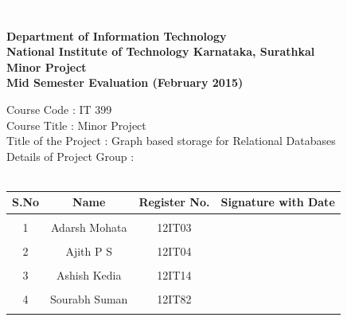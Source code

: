 \documentclass[12pt, oneside]{book}
\begin{document}
 \pagebreak \textcolor{white}{text}
\thispagestyle{empty}
\pagebreak
\begin{center}
\Large
\textbf{Department of Information Technology} \\
\normalsize
\textbf{National Institute of Technology Karnataka, Surathkal} \\
\vspace{1cm} \Large
\textbf{Minor Project} \\ \vspace{0.5cm}
\textbf{Mid Semester Evaluation (February 2015)}
\vspace{1cm}
\end{center}
Course Code : IT 399 \\
Course Title : Minor Project \\
Title of the Project : Graph based storage for Relational Databases \\
Details of Project Group : \\
\vspace{5mm}
\\
\begin{table}[h!]
  \begin{center}
   \begin{tabular}{ p{} | p{} | p{} | p{} }
      \hline
      \multicolumn{1}{|c|}{\textbf{S.No}} & \multicolumn{1}{c|}{\textbf{Name}} & \multicolumn{1}{c|}{\textbf{Register No.}} & \multicolumn{1}{c|}{\textbf{Signature with Date}} \\ \hline
      \multicolumn{1}{c}{} & \multicolumn{1}{c}{} & \multicolumn{1}{c}{} & \multicolumn{1}{c}{\hspace{4cm}}\\
      \multicolumn{1}{c}{1} & \multicolumn{1}{c}{Adarsh Mohata} & \multicolumn{1}{c}{12IT03} & \multicolumn{1}{c}{}\\
      \multicolumn{1}{c}{} & \multicolumn{1}{c}{} & \multicolumn{1}{c}{} & \multicolumn{1}{c}{}\\
      \multicolumn{1}{c}{2} & \multicolumn{1}{c}{Ajith P S} & \multicolumn{1}{c}{12IT04} & \multicolumn{1}{c}{}\\
      \multicolumn{1}{c}{} & \multicolumn{1}{c}{} & \multicolumn{1}{c}{} & \multicolumn{1}{c}{}\\
      \multicolumn{1}{c}{3} & \multicolumn{1}{c}{Ashish Kedia} & \multicolumn{1}{c}{12IT14} & \multicolumn{1}{c}{}\\
      \multicolumn{1}{c}{} & \multicolumn{1}{c}{} & \multicolumn{1}{c}{} & \multicolumn{1}{c}{}\\
      \multicolumn{1}{c}{4} & \multicolumn{1}{c}{Sourabh Suman} & \multicolumn{1}{c}{12IT82} & \multicolumn{1}{c}{}\\
      \multicolumn{1}{c}{} & \multicolumn{1}{c}{} & \multicolumn{1}{c}{} & \multicolumn{1}{c}{}\\
   \end{tabular}

  \end{center}

\end{table}
\end{document}

